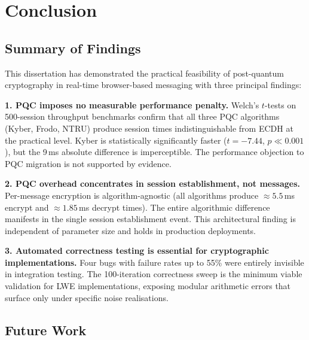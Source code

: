 \documentclass[12pt,a4paper]{report}
\begin{document}
\chapter{Conclusion}

\section{Summary of Findings}

This dissertation has demonstrated the practical feasibility of post-quantum
cryptography in real-time browser-based messaging with three principal findings:

\textbf{1. PQC imposes no measurable performance penalty.}
Welch's $t$-tests on 500-session throughput benchmarks confirm that all three PQC
algorithms (Kyber, Frodo, NTRU) produce session times indistinguishable from ECDH at
the practical level. Kyber is statistically significantly faster ($t = -7.44$,
$p \ll 0.001$), but the 9\,ms absolute difference is imperceptible. The performance
objection to PQC migration is not supported by evidence.

\textbf{2. PQC overhead concentrates in session establishment, not messages.}
Per-message encryption is algorithm-agnostic (all algorithms produce $\approx 5.5$\,ms
encrypt and $\approx 1.85$\,ms decrypt times). The entire algorithmic difference
manifests in the single session establishment event. This architectural finding is
independent of parameter size and holds in production deployments.

\textbf{3. Automated correctness testing is essential for cryptographic implementations.}
Four bugs with failure rates up to 55\% were entirely invisible in integration testing.
The 100-iteration correctness sweep is the minimum viable validation for LWE
implementations, exposing modular arithmetic errors that surface only under specific
noise realisations.

\section{Future Work}
\end{document}
